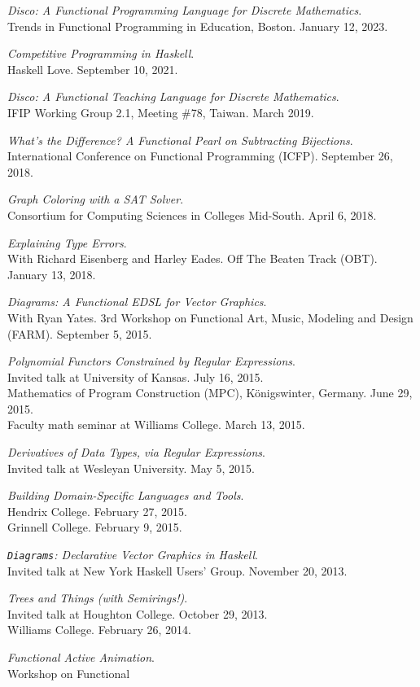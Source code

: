 \documentclass[12pt]{article}
\newcommand{\cvitem}{\par\hangpara{2em}{1}}
\begin{document}
\cvitem \emph{Disco: A Functional Programming Language for Discrete
  Mathematics}. \\ Trends in Functional Programming in Education,
Boston. January 12, 2023.
\cvitem \emph{Competitive Programming in Haskell}. \\ Haskell
Love. September 10, 2021.
\cvitem \emph{Disco: A Functional Teaching Language for Discrete
  Mathematics}. \\ IFIP Working Group 2.1, Meeting \#78, Taiwan. March 2019.
\cvitem \emph{What's the Difference? A Functional Pearl on Subtracting
    Bijections}. \\ International Conference on Functional Programming
    (ICFP). September 26, 2018.
\cvitem \emph{Graph Coloring with a SAT Solver}. \\
    Consortium for Computing Sciences in Colleges Mid-South.  April 6, 2018.
\cvitem \emph{Explaining Type Errors}. \\
    With Richard Eisenberg and Harley Eades.  Off The Beaten Track
    (OBT). January 13, 2018.
\cvitem \emph{Diagrams: A Functional EDSL for Vector Graphics}. \\
    With Ryan Yates. 3rd Workshop on Functional
    Art, Music, Modeling and Design (FARM).  September 5, 2015.
\cvitem \emph{Polynomial Functors Constrained by Regular
    Expressions}. \\ Invited talk at University of Kansas. July 16, 2015.
    \\ Mathematics of Program Construction (MPC),
    K\"onigswinter, Germany. June 29, 2015.
    \\ Faculty math seminar at Williams College. March 13, 2015.
\cvitem \emph{Derivatives of Data Types, via Regular
    Expressions}. \\ Invited talk at Wesleyan University. May 5, 2015.
\cvitem \emph{Building Domain-Specific Languages and Tools}. \\
    Hendrix College. February 27, 2015. \\
    Grinnell College. February 9, 2015.
\cvitem \emph{\texttt{Diagrams}: Declarative Vector Graphics in
    Haskell}. \\ Invited talk at New York Haskell Users' Group. November
    20, 2013.
\cvitem \emph{Trees and Things (with Semirings!)}. \\ Invited talk at Houghton
    College. October 29, 2013. \\
    Williams College. February 26, 2014.
\cvitem \emph{Functional Active Animation}. \\ Workshop on Functional
\end{document}
